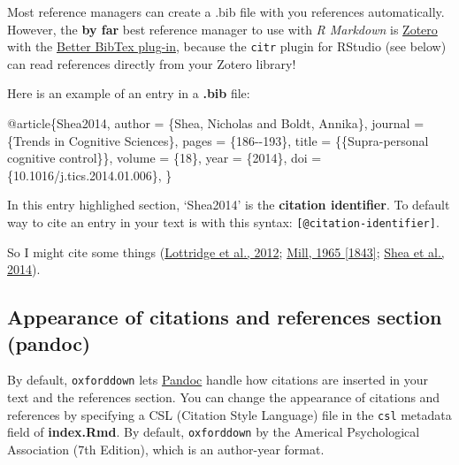 \documentclass[a4paper, nobind]{templates/ociamthesis}
\newenvironment{Shaded}{\begin{snugshade}}{\end{snugshade}}
\newcommand{\DataTypeTok}[1]{\textcolor[rgb]{0.13,0.29,0.53}{#1}}
\newcommand{\NormalTok}[1]{#1}
\newcommand{\OtherTok}[1]{\textcolor[rgb]{0.56,0.35,0.01}{#1}}
\newcommand{\VariableTok}[1]{\textcolor[rgb]{0.00,0.00,0.00}{#1}}
\renewenvironment{Shaded}
{
  \vspace{10pt}%
  \begin{snugshade}%
}{%
  \end{snugshade}%
  \vspace{8pt}%
}
\begin{document}
Most reference managers can create a .bib file with you references automatically.
However, the \textbf{by far} best reference manager to use with \emph{R Markdown} is \href{https://www.zotero.org}{Zotero} with the \href{https://retorque.re/zotero-better-bibtex/}{Better BibTex plug-in}, because the \texttt{citr} plugin for RStudio (see below) can read references directly from your Zotero library!

Here is an example of an entry in a \textbf{.bib} file:

\begin{Shaded}
\begin{Highlighting}[]
\VariableTok{@article}\NormalTok{\{}\OtherTok{Shea2014}\NormalTok{,}
  \DataTypeTok{author}\NormalTok{ =        \{Shea, Nicholas and Boldt, Annika\},}
  \DataTypeTok{journal}\NormalTok{ =       \{Trends in Cognitive Sciences\},}
  \DataTypeTok{pages}\NormalTok{ =         \{186{-}{-}193\},}
  \DataTypeTok{title}\NormalTok{ =         \{\{Supra{-}personal cognitive control\}\},}
  \DataTypeTok{volume}\NormalTok{ =        \{18\},}
  \DataTypeTok{year}\NormalTok{ =          \{2014\},}
  \DataTypeTok{doi}\NormalTok{ =           \{10.1016/j.tics.2014.01.006\},}
\NormalTok{\}}
\end{Highlighting}
\end{Shaded}

In this entry highlighed section, `Shea2014' is the \textbf{citation identifier}.
To default way to cite an entry in your text is with this syntax: \texttt{{[}@citation-identifier{]}}.

So I might cite some things (\protect\hyperlink{ref-Lottridge2012}{Lottridge et al., 2012}; \protect\hyperlink{ref-Mill1965}{Mill, 1965 {[}1843{]}}; \protect\hyperlink{ref-Shea2014}{Shea et al., 2014}).

\hypertarget{citation-appearance}{%
\subsection{Appearance of citations and references section (pandoc)}\label{citation-appearance}}

By default, \texttt{oxforddown} lets \href{https://pandoc.org}{Pandoc} handle how citations are inserted in your text and the references section.
You can change the appearance of citations and references by specifying a CSL (Citation Style Language) file in the \texttt{csl} metadata field of \textbf{index.Rmd}.
By default, \texttt{oxforddown} by the Americal Psychological Association (7th Edition), which is an author-year format.
\end{document}
